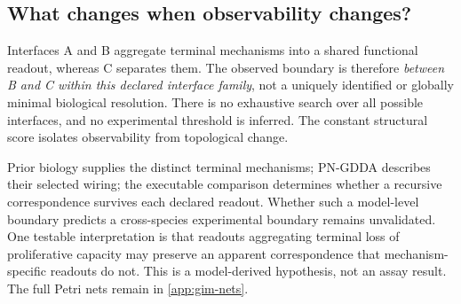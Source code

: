\subsection{What changes when observability changes?}
Interfaces A and B aggregate terminal mechanisms into a shared functional
readout, whereas C separates them. The observed boundary is therefore
\emph{between B and C within this declared interface family}, not a uniquely
identified or globally minimal biological resolution. There is no exhaustive
search over all possible interfaces, and no experimental threshold is inferred.
The constant structural score isolates observability from topological change.

Prior biology supplies the distinct terminal mechanisms; PN-GDDA describes
their selected wiring; the executable comparison determines whether a
recursive correspondence survives each declared readout. Whether such a
model-level boundary predicts a cross-species experimental boundary remains
unvalidated. One testable interpretation is that readouts aggregating terminal
loss of proliferative capacity may preserve an apparent correspondence that
mechanism-specific readouts do not. This is a model-derived hypothesis, not an
assay result. The full Petri nets remain in \ref{app:gim-nets}.
